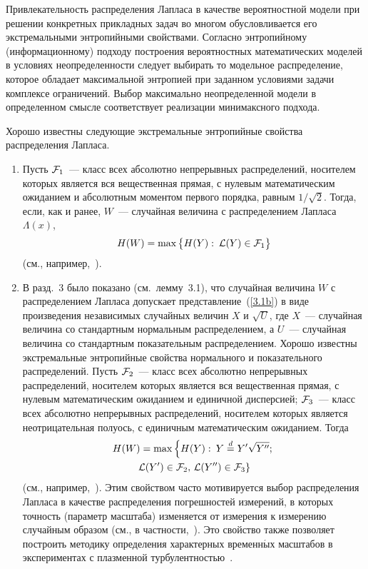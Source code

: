 \begin{multicols}{2}
Привлекательность распределения Лапласа в качестве вероятностной
модели при решении конкретных прикладных задач во многом
обусловливается его экстремальными энтропийными свойствами.
Согласно энтропийному (информационному) подходу построения
вероятностных математических моделей в условиях неопределенности
следует выбирать то модельное распределение, которое обладает
максимальной энтропией при заданном условиями задачи комплексе
ограничений. Выбор максимально неопределенной модели в
определенном смысле соответствует реализации минимаксного подхода.

Хорошо известны следующие экстремальные энтропийные свойства
распределения Лапласа.
\begin{enumerate}[1.]
\item  Пусть ${\cal F}_1$~--- класс всех абсолютно непрерывных
распределений, носителем которых является вся вещественная прямая,
с нулевым математическим ожиданием и абсолютным моментом первого
порядка, равным $1/\sqrt{2}$. Тогда, если, как и ранее, $W$~---
случайная величина с распределением Лапласа $\Lambda(x)$, 
$$
H(W)=\max\big\{H(Y):\: {\cal L}(Y)\in{\cal F}_1\big\}
$$
(см., например,~\cite{41be}).
\item
В разд.~3 было показано (см.\ лемму~3.1), что случайная
величина $W$ с распределением Лапласа допускает представление~(\ref{3.1b})
в виде произведения независимых случайных величин $X$ и
$\sqrt{U}$, где $X$~--- случайная величина со стандартным
нормальным распределением, а $U$~--- случайная величина со
стандартным показательным распределением. Хорошо известны
экстремальные энтропийные свойства нормального и показательного
распределений. Пусть ${\cal F}_2$~--- класс всех абсолютно
непрерывных распределений, носителем которых является вся
вещественная прямая, с нулевым математическим ожиданием и
единичной дисперсией; ${\cal F}_3$~--- класс всех абсолютно
непрерывных распределений, носителем которых является
неотрицательная полуось, с единичным математическим ожиданием.
Тогда
\begin{multline*}
H(W)=\max\left \{ H(Y):\: Y\stackrel{d}{=} Y'\sqrt{Y''};\right. \\
\left.{\cal
L}(Y')\in{\cal F}_2,\,{\cal L}(Y'')\in{\cal F}_3\right \}
\end{multline*}
(см., например,~\cite{41be}). Этим свойством часто мотивируется выбор
распределения Лапласа в качестве распределения погрешностей
измерений, в которых точность (параметр масштаба) изменяется от
измерения к измерению случайным образом (см., в частности,~\cite{52be, 17be}).
Это свойство также позволяет построить методику определения
характерных временн$\acute{\mbox{ы}}$х масштабов в экспериментах с плазменной
турбулентностью~\cite{11be}.
\end{enumerate}


\end{multicols}
